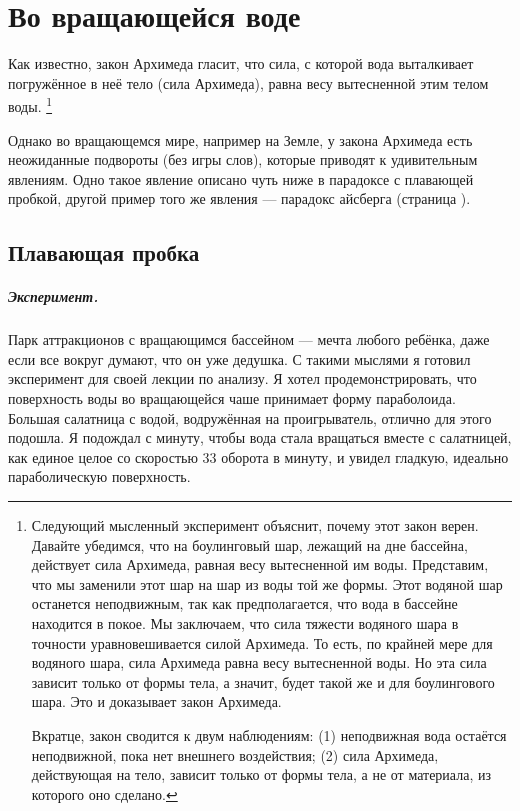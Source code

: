 \chapter{Во вращающейся воде}

Как известно, закон Архимеда гласит, что сила, с которой вода выталкивает погружённое в неё тело (сила Архимеда), равна весу вытесненной этим телом воды.%
\footnote{Следующий мысленный эксперимент объяснит, почему этот закон верен.
Давайте убедимся, что на боулинговый шар, лежащий на дне бассейна, действует сила Архимеда, равная весу вытесненной им воды.
Представим, что мы заменили этот шар на шар из воды той же формы.
Этот водяной шар останется неподвижным, так как предполагается, что вода в бассейне находится в покое.
Мы заключаем, что сила тяжести водяного шара в точности уравновешивается силой Архимеда.
То есть, по крайней мере для водяного шара, сила Архимеда равна весу вытесненной воды.
Но эта сила зависит только от формы тела, а значит, будет такой же и для боулингового шара.
Это и доказывает закон Архимеда.

Вкратце, закон сводится к двум наблюдениям:
(1) неподвижная вода остаётся неподвижной, пока нет внешнего воздействия;
(2) сила Архимеда, действующая на тело, зависит только от формы тела, а не от материала, из которого оно сделано.}

Однако во вращающемся мире, например на Земле, у закона Архимеда есть неожиданные подвороты (без игры слов), которые приводят к удивительным явлениям.
Одно такое явление описано чуть ниже в парадоксе с плавающей пробкой,
другой пример того же явления --- парадокс айсберга (страница \pageref{sec:iceberg}).

\section{Плавающая пробка}\label{sec:cork}

\paragraph{Эксперимент.}
Парк аттракционов с вращающимся бассейном --- мечта любого ребёнка, даже если все вокруг думают, что он уже дедушка.
С такими мыслями я готовил эксперимент для своей лекции по анализу.
Я хотел продемонстрировать, что поверхность воды во вращающейся чаше принимает форму параболоида.
Большая салатница с водой, водружённая на проигрыватель, отлично для этого подошла.
Я подождал с минуту, чтобы вода стала вращаться вместе с салатницей, как единое целое со скоростью 33 оборота в минуту, и увидел гладкую, идеально параболическую поверхность.

